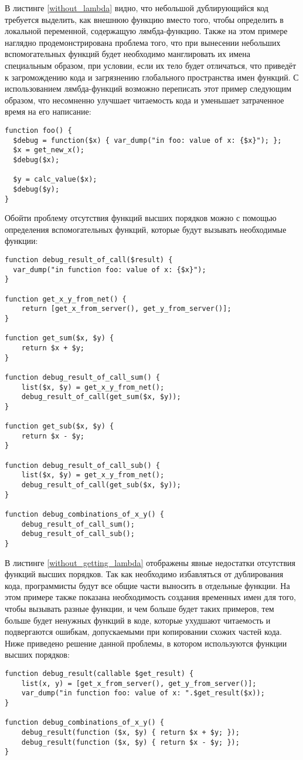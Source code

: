 В листинге \ref{without_lambda} видно, что небольшой дублирующийся код требуется выделить, как внешнюю функцию вместо того, чтобы определить в локальной переменной, содержащую лямбда-функцию.
Также на этом примере наглядно продемонстрирована проблема того, что при вынесении небольших вспомогательных функций будет необходимо манглировать их имена специальным образом,  при условии, если их тело будет отличаться, что приведёт к загромождению кода и загрязнению глобального пространства имен функций.
С использованием лямбда-функций возможно переписать этот пример следующим образом, что несомненно улучшает читаемость кода и уменьшает затраченное время на его написание:
\begin{lstlisting}
function foo() {
  $debug = function($x) { var_dump("in foo: value of x: {$x}"); };
  $x = get_new_x();
  $debug($x);

  $y = calc_value($x);
  $debug($y);
}
\end{lstlisting}

Обойти проблему отсутствия функций высших порядков можно с помощью определения вспомогательных функций, которые будут вызывать необходимые функции:
\begin{lstlisting}[caption={Пример кода без функций высших порядков},label={without_getting_lambda}]
function debug_result_of_call($result) {
  var_dump("in function foo: value of x: {$x}");
}

function get_x_y_from_net() {
	return [get_x_from_server(), get_y_from_server()];
}

function get_sum($x, $y) {
    return $x + $y;
}

function debug_result_of_call_sum() {
	list($x, $y) = get_x_y_from_net();
	debug_result_of_call(get_sum($x, $y));
}

function get_sub($x, $y) {
    return $x - $y;
}

function debug_result_of_call_sub() {
	list($x, $y) = get_x_y_from_net();
	debug_result_of_call(get_sub($x, $y));
}

function debug_combinations_of_x_y() {
	debug_result_of_call_sum();
	debug_result_of_call_sub();
}
\end{lstlisting}

В листинге \ref{without_getting_lambda} отображены явные недостатки отсутствия функций высших порядков.
Так как необходимо избавляться от дублирования кода, программисты будут все общие части выносить в отдельные функции.
На этом примере также показана необходимость создания временных имен для того, чтобы вызывать разные функции, и чем больше будет таких примеров, тем больше будет ненужных функций в коде, которые ухудшают читаемость и подвергаются ошибкам, допускаемыми при копировании схожих частей кода.
Ниже приведено решение данной проблемы, в котором используются функции высших порядков:
\begin{lstlisting}
function debug_result(callable $get_result) {
	list(x, y) = [get_x_from_server(), get_y_from_server()];
	var_dump("in function foo: value of x: ".$get_result($x));
}

function debug_combinations_of_x_y() {
	debug_result(function ($x, $y) { return $x + $y; });
	debug_result(function ($x, $y) { return $x - $y; });
}
\end{lstlisting}

